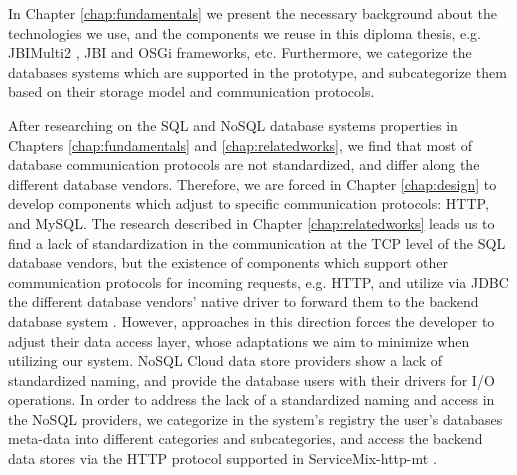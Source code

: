 In Chapter \ref{chap:fundamentals} we present the necessary background about the technologies we use, and the components we reuse in this diploma thesis, e.g. JBIMulti2 \cite{Muhler2012}, \ac{JBI} and \ac{OSGi} frameworks, etc. Furthermore, we categorize the databases systems which are supported in the prototype, and subcategorize them based on their storage model and communication protocols. 

After researching on the \ac{SQL} and \ac{NoSQL} database systems properties in Chapters \ref{chap:fundamentals} and \ref{chap:relatedworks}, we find that most of database communication protocols are not standardized, and differ along the different database vendors. Therefore, we are forced in Chapter \ref{chap:design} to develop components which adjust to specific communication protocols: \ac{HTTP}, and MySQL. The research described in Chapter \ref{chap:relatedworks} leads us to find a lack of standardization in the communication at the TCP level of the \ac{SQL} database vendors, but the existence of components which support other communication protocols for incoming requests, e.g. \ac{HTTP}, and utilize via \ac{JDBC} the different database vendors' native driver to forward them to the backend database system \cite{jboss2011}. However, approaches in this direction forces the developer to adjust their data access layer, whose adaptations we aim to minimize when utilizing our system. \ac{NoSQL} Cloud data store providers show a lack of standardized naming, and provide the database users with their drivers for I/O operations. In order to address the lack of a standardized naming and access in the \ac{NoSQL} providers, we categorize in the system's registry the user's databases meta-data into different categories and subcategories, and access the backend data stores via the \ac{HTTP} protocol supported in ServiceMix-http-mt \cite{gomez2012}. 

